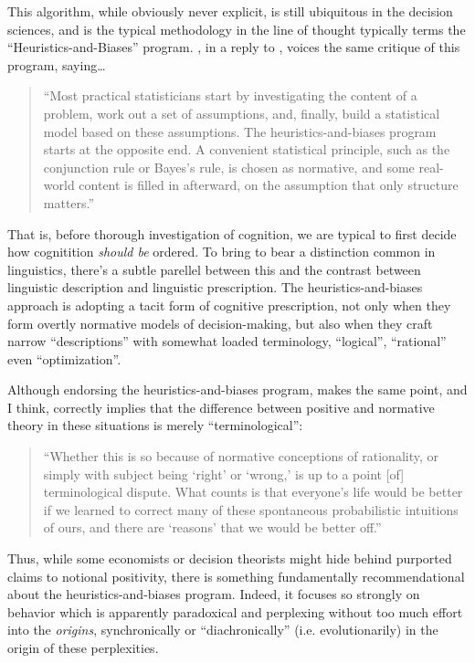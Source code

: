 \documentclass{article}
\begin{document}
This algorithm, while obviously never explicit, is still ubiquitous in the decision sciences, and is the typical methodology in the line of thought typically terms the ``Heuristics-and-Biases'' program.
\textcite{gigerenzer96}, in a reply to \textcite{kahneman96}, voices the same critique of this program, saying\ldots

\begin{quotation}
	``Most practical statisticians start by investigating the content of a problem, work out a set of assumptions, and, finally, build a statistical model based on these assumptions.
	The heuristics-and-biases program starts at the opposite end.
	A convenient statistical principle, such as the conjunction rule or Bayes's rule, is chosen as normative, and some real-world content is filled in afterward, on the assumption that only structure matters.''
\end{quotation}

That is, before thorough investigation of cognition, we are typical to first decide how cognitition \emph{should be} ordered.
To bring to bear a distinction common in linguistics, there's a subtle parellel between this and the contrast between linguistic description and linguistic prescription.
The heuristics-and-biases approach is adopting a tacit form of cognitive prescription, not only when they form overtly normative models of decision-making, but also when they craft narrow ``descriptions'' with somewhat loaded terminology, ``logical'', ``rational'' even ``optimization''.

Although endorsing the heuristics-and-biases program, \textcite[194]{massimo96} makes the same point, and I think, correctly implies that the difference between positive and normative theory in these situations is merely ``terminological'':

\begin{quotation}
	``Whether this is so because of normative conceptions of rationality, or simply with subject being `right' or `wrong,' is up to a point [of] terminological dispute. What counts is that everyone's life would be better if we learned to correct many of these spontaneous probabilistic intuitions of ours, and there are `reasons' that we would be better off.''
\end{quotation}

Thus, while some economists or decision theorists might hide behind purported claims to notional positivity, there is something fundamentally recommendational about the heuristics-and-biases program.
Indeed, it focuses so strongly on behavior which is apparently paradoxical and perplexing without too much effort into the \emph{origins}, synchronically or ``diachronically'' (i.e. evolutionarily) in the origin of these perplexities.
\end{document}

